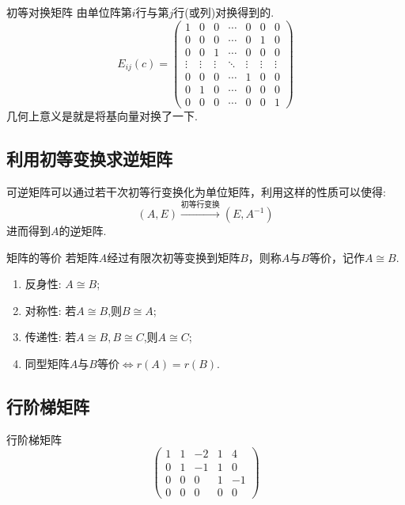 \documentclass[lang=cn,10pt]{elegantbook}
\begin{document}
\begin{definition}{初等对换矩阵}
    由单位阵第$i$行与第$j$行(或列)对换得到的.
    \begin{equation}
        E_{ij}(c) = \begin{pmatrix}
            1&0&0&\cdots&0&0&0\\
            0&0&0&\cdots&0&1&0\\
            0&0&1&\cdots&0&0&0\\
            \vdots&\vdots&\vdots&\ddots&\vdots&\vdots&\vdots\\
            0&0&0&\cdots&1&0&0\\
            0&1&0&\cdots&0&0&0\\
            0&0&0&\cdots&0&0&1
        \end{pmatrix}
    \end{equation}
    几何上意义是就是将基向量对换了一下.
\end{definition}

\subsection{利用初等变换求逆矩阵}
\begin{theorem}
    可逆矩阵可以通过若干次初等行变换化为单位矩阵，利用这样的性质可以使得:
    \begin{equation}
        (A,E)\stackrel{\text{初等行变换}}{\longrightarrow{}}(E,A^{-1})
    \end{equation}
    进而得到$A$的逆矩阵.
\end{theorem}

\begin{definition}{矩阵的等价}
    若矩阵$A$经过有限次初等变换到矩阵$B$，则称$A$与$B$等价，记作$A \cong B$.
\end{definition}

\begin{property}
    \begin{enumerate}
        \item 反身性: $A \cong B$;
        \item 对称性: 若$A \cong B$,则$B \cong A$;
        \item 传递性: 若$A \cong B, B \cong C$,则$A \cong C$;
        \item 同型矩阵$A$与$B$等价$\Leftrightarrow r(A) = r(B)$.
    \end{enumerate}
\end{property}

\subsection{行阶梯矩阵}
\begin{definition}{行阶梯矩阵}
\begin{equation}
    \begin{pmatrix}
        1 & 1 & -2 & 1 & 4\\
        0 & 1 & -1 & 1 & 0\\
        0 & 0 &  0 & 1 & -1\\
        0 & 0 &  0 & 0 & 0
    \end{pmatrix}
\end{equation}
\end{definition}
\end{document}
